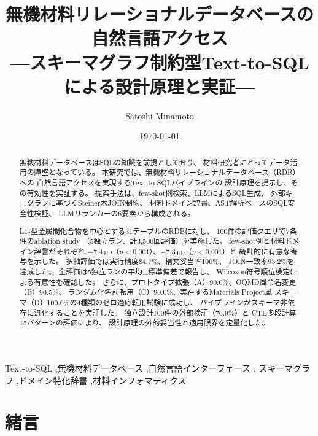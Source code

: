 \documentclass[5p,twocolumn]{elsarticle}
\begin{document}
\begin{frontmatter}

\title{無機材料リレーショナルデータベースの自然言語アクセス\\---スキーマグラフ制約型Text-to-SQLによる設計原理と実証---}

\author[nims]{Satoshi Minamoto}
\address[nims]{National Institute for Materials Science (NIMS),
  1-2-1 Sengen, Tsukuba, Ibaraki 305-0047, Japan}

\date{\today}

\begin{abstract}
無機材料データベースはSQLの知識を前提としており、
材料研究者にとってデータ活用の障壁となっている。
本研究では、無機材料リレーショナルデータベース（RDB）への
自然言語アクセスを実現するText-to-SQLパイプラインの
設計原理を提示し、その有効性を実証する。
提案手法は、few-shot例検索、LLMによるSQL生成、
外部キーグラフに基づくSteiner木JOIN制約、
材料ドメイン辞書、AST解析ベースのSQL安全性検証、
LLMリランカーの6要素から構成される。

L1$_2$型金属間化合物を中心とする31テーブルのRDBに対し、
100件の評価クエリで7条件のablation study
（5独立ラン、計3{,}500回評価）を実施した。
few-shot例と材料ドメイン辞書がそれぞれ
$-$7.4\,pp（$p<0.001$）、$-$7.3\,pp（$p<0.001$）と
統計的に有意な寄与を示した。
多軸評価では実行精度84.7\%、構文妥当率100\%、
JOIN一致率93.2\%を達成した。
全評価は5独立ランの平均$\pm$標準偏差で報告し、
Wilcoxon符号順位検定による有意性を確認した。
さらに、プロトタイプ拡張（A）90.0\%、OQMD風命名変更（B）90.5\%、
ランダム化名前転用（C）90.0\%、実在するMaterials Project風
スキーマ（D）100.0\%の4種類のゼロ適応転用試験に成功し、
パイプラインがスキーマ非依存に汎化することを実証した。
独立設計100件の外部検証（76.9\%）と
CTE多段計算15パターンの評価により、
設計原理の外的妥当性と適用限界を定量化した。

\end{abstract}

\begin{keyword}
Text-to-SQL \sep 無機材料データベース \sep 自然言語インターフェース \sep
スキーマグラフ \sep ドメイン特化辞書 \sep 材料インフォマティクス
\end{keyword}

\end{frontmatter}

\section{緒言}
\label{sec:introduction}
\end{document}

